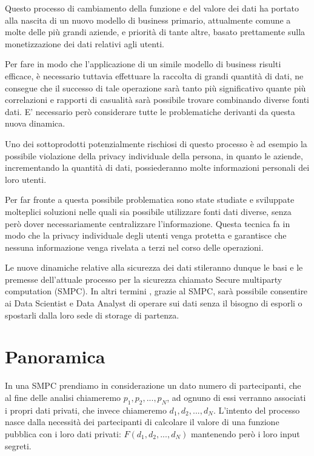 \documentclass[
]{book}
\begin{document}
Questo processo di cambiamento della funzione e del valore dei dati ha portato alla nascita di un nuovo modello di business primario, attualmente comune a molte delle più grandi aziende, e priorità di tante altre, basato prettamente sulla monetizzazione dei dati relativi agli utenti.

Per fare in modo che l'applicazione di un simile modello di business risulti efficace, è necessario tuttavia effettuare la raccolta di grandi quantità di dati, ne consegue che il successo di tale operazione sarà tanto più significativo quante più correlazioni e rapporti di casualità sarà possibile trovare combinando diverse fonti dati. E' necessario però considerare tutte le problematiche derivanti da questa nuova dinamica.

Uno dei sottoprodotti potenzialmente rischiosi di questo processo è ad esempio la possibile violazione della privacy individuale della persona, in quanto le aziende, incrementando la quantità di dati, possiederanno molte informazioni personali dei loro utenti.

Per far fronte a questa possibile problematica sono state studiate e sviluppate molteplici soluzioni nelle quali sia possibile utilizzare fonti dati diverse, senza però dover necessariamente centralizzare l'informazione. Questa tecnica fa in modo che la privacy individuale degli utenti venga protetta e garantisce che nessuna informazione venga rivelata a terzi nel corso delle operazioni.

Le nuove dinamiche relative alla sicurezza dei dati stileranno dunque le basi e le premesse dell'attuale processo per la sicurezza chiamato Secure multiparty computation (SMPC). In altri termini , grazie al SMPC, sarà possibile consentire ai Data Scientist e Data Analyst di operare sui dati senza il bisogno di esporli o spostarli dalla loro sede di storage di partenza.\citep{du2001secure}

\newpage

\hypertarget{panoramica}{%
\section{Panoramica}\label{panoramica}}

In una SMPC prendiamo in considerazione un dato numero di partecipanti, che al fine delle analisi chiameremo \(p_1, p_2, ..., p_N\), ad ognuno di essi verranno associati i propri dati privati, che invece chiameremo \(d_1, d_2, ..., d_N\). L'intento del processo nasce dalla necessità dei partecipanti di calcolare il valore di una funzione pubblica con i loro dati privati: \(F(d_1, d_2, ..., d_N)\) mantenendo però i loro input segreti.
\end{document}
